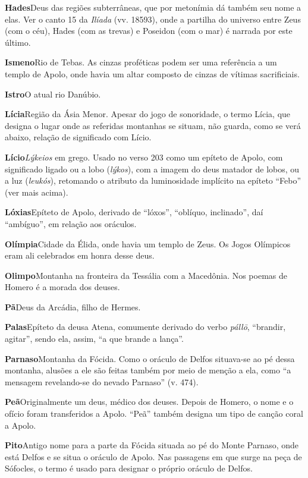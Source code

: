 \textbf{Hades}\quad Deus das regiões subterrâneas, que por metonímia dá
também seu nome a elas. Ver o canto 15 da \emph{Ilíada} (vv. 18593),
onde a partilha do universo entre Zeus (com o céu), Hades (com as
trevas) e Poseidon (com o mar) é narrada por este último.

\textbf{Ismeno}\quad Rio de Tebas. As cinzas proféticas podem ser uma
referência a um templo de Apolo, onde havia um altar composto de cinzas
de vítimas sacrificiais.

\textbf{Istro}\quad O atual rio Danúbio.

\textbf{Lícia}\quad Região da Ásia Menor. Apesar do jogo de sonoridade,
o termo Lícia, que designa o lugar onde as referidas montanhas se
situam, não guarda, como se verá abaixo, relação de significado com
Lício.

\textbf{Lício}\quad \emph{Lýkeios} em grego. Usado no verso 203 como um
epíteto de Apolo, com significado ligado ou a lobo (\emph{lýkos}), com a
imagem do deus matador de lobos, ou a luz (\emph{leukós}), retomando o
atributo da luminosidade implícito na epíteto ``Febo'' (ver mais acima).

\textbf{Lóxias}\quad Epíteto de Apolo, derivado de ``lóxos'', ``oblíquo,
inclinado'', daí ``ambíguo'', em relação aos oráculos.

\textbf{Olímpia}\quad Cidade da Élida, onde havia um templo de Zeus. Os
Jogos Olímpicos eram ali celebrados em honra desse deus.

\textbf{Olimpo}\quad Montanha na fronteira da Tessália com a Macedônia.
Nos poemas de Homero é a morada dos deuses.

\textbf{Pã}\quad Deus da Arcádia, filho de Hermes.

\textbf{Palas}\quad Epíteto da deusa Atena, comumente derivado do verbo
\emph{pállō}, ``brandir, agitar'', sendo ela, assim, ``a que brande a
lança''.

\textbf{Parnaso}\quad Montanha da Fócida. Como o oráculo de Delfos
situava-se ao pé dessa montanha, alusões a ele são feitas também por
meio de menção a ela, como ``a mensagem revelando-se do nevado Parnaso''
(v. 474).

\textbf{Peã}\quad Originalmente um deus, médico dos deuses. Depois de
Homero, o nome e o ofício foram transferidos a Apolo. ``Peã'' também
designa um tipo de canção coral a Apolo.

\textbf{Pito}\quad Antigo nome para a parte da Fócida situada ao pé do
Monte Parnaso, onde está Delfos e se situa o oráculo de Apolo. Nas
passagens em que surge na peça de Sófocles, o termo é usado para
designar o próprio oráculo de Delfos.

